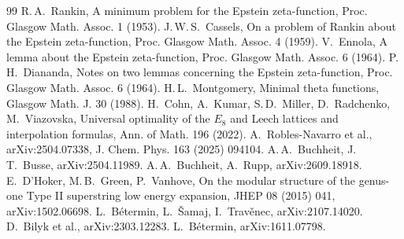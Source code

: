 \documentclass[11pt,a4paper]{amsart}
\theoremstyle{definition}
\begin{document}
\begin{thebibliography}{99}
 R.\,A.~Rankin, A minimum problem for the Epstein zeta-function, Proc. Glasgow Math. Assoc. 1 (1953).
 J.\,W.\,S.~Cassels, On a problem of Rankin about the Epstein zeta-function, Proc. Glasgow Math. Assoc. 4 (1959).
 V.~Ennola, A lemma about the Epstein zeta-function, Proc. Glasgow Math. Assoc. 6 (1964).
 P.\,H.~Diananda, Notes on two lemmas concerning the Epstein zeta-function, Proc. Glasgow Math. Assoc. 6 (1964).
 H.\,L.~Montgomery, Minimal theta functions, Glasgow Math. J. 30 (1988).
 H.~Cohn, A.~Kumar, S.\,D.~Miller, D.~Radchenko, M.~Viazovska, Universal optimality of the $E_8$ and Leech lattices and interpolation formulas, Ann. of Math. 196 (2022).
 A.~Robles-Navarro et al., arXiv:2504.07338, J. Chem. Phys. 163 (2025) 094104.
 A.\,A.~Buchheit, J.\,T.~Busse, arXiv:2504.11989.
 A.\,A.~Buchheit, A.~Rupp, arXiv:2609.18918.
 E.~D'Hoker, M.\,B.~Green, P.~Vanhove, On the modular structure of the genus-one Type II superstring low energy expansion, JHEP 08 (2015) 041, arXiv:1502.06698.
 L.~B\'etermin, L.~\v{S}amaj, I.~Trav\v{e}nec, arXiv:2107.14020.
 D.~Bilyk et al., arXiv:2303.12283.
 L.~B\'etermin, arXiv:1611.07798.
\end{thebibliography}
\end{document}
